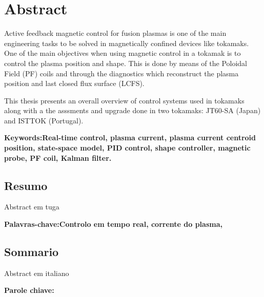 \chapter*{Abstract}
Active feedback magnetic control for fusion plasmas is one of the main engineering tasks to be solved in magnetically  confined devices like tokamaks. One of the main objectives when using magnetic control in a tokamak is to control the plasma position and shape. This is done by means of the Poloidal Field (PF) coils and through the diagnostics which reconstruct the plasma position and last closed flux surface (LCFS).
\smallskip

This thesis presents an overall overview of control systems used in tokamaks along with a the asssments and upgrade done in two tokamaks: JT60-SA (Japan) and ISTTOK (Portugal).
\vfill

\textbf{Keywords:Real-time control, plasma current, plasma current centroid position, state-space model, PID control, shape controller, magnetic probe, PF coil, Kalman filter.} 

\pagebreak
\begin{otherlanguage}{portuguese}
\chapter*{Resumo}
Abstract em tuga

\vfill

\textbf{ Palavras-chave:Controlo em tempo real, corrente do plasma,  } 
\end{otherlanguage}
\pagebreak
\begin{otherlanguage}{italian}
\chapter*{Sommario}

Abstract em italiano


\vfill

\textbf{Parole chiave:} 
\end{otherlanguage}



